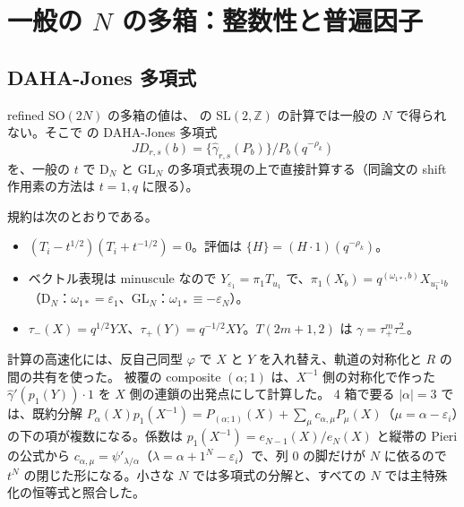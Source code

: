 \section{一般の $N$ の多箱：整数性と普遍因子}\label{sec:generalN}

\subsection{DAHA-Jones 多項式}
refined SO$(2N)$ の多箱の値は、\cite{AgSc12} の SL$(2,\mathbb{Z})$ の計算では一般の $N$ で得られない。そこで \cite{Cherednik11} の DAHA-Jones 多項式
\[
JD_{r,s}(b) = \{\hat\gamma_{r,s}(P_b)\}/P_b(q^{-\rho_k})
\]
を、一般の $t$ で D$_N$ と GL$_N$ の多項式表現の上で直接計算する（同論文の shift 作用素の方法は $t = 1, q$ に限る）。

規約は次のとおりである。
\begin{itemize}
\item $(T_i - t^{1/2})(T_i + t^{-1/2}) = 0$。評価は $\{H\} = (H\cdot 1)(q^{-\rho_k})$。
\item ベクトル表現は minuscule なので $Y_{\varepsilon_1} = \pi_1 T_{u_1}$ で、$\pi_1(X_b) = q^{(\omega_{1*}, b)}X_{u_1^{-1}b}$（D$_N$：$\omega_{1*} = \varepsilon_1$、GL$_N$：$\omega_{1*} \equiv -\varepsilon_N$）。
\item $\tau_-(X) = q^{1/2}YX$、$\tau_+(Y) = q^{-1/2}XY$。$T(2m+1, 2)$ は $\gamma = \tau_+^m\tau_-^2$。
\end{itemize}
計算の高速化には、反自己同型 $\varphi$ で $X$ と $Y$ を入れ替え、軌道の対称化と $R$ の間の共有を使った。
被覆の composite $(\alpha;1)$ は、$X^{-1}$ 側の対称化で作った $\hat\gamma'(p_1(Y))\cdot 1$ を $X$ 側の連鎖の出発点にして計算した。
4 箱で要る $|\alpha| = 3$ では、既約分解 $P_\alpha(X)p_1(X^{-1}) = P_{(\alpha;1)}(X) + \sum_\mu c_{\alpha,\mu}P_\mu(X)$（$\mu = \alpha - \varepsilon_i$）の下の項が複数になる。係数は $p_1(X^{-1}) = e_{N-1}(X)/e_N(X)$ と縦帯の Pieri の公式から $c_{\alpha,\mu} = \psi'_{\lambda/\alpha}$（$\lambda = \alpha + 1^N - \varepsilon_i$）で、列 0 の脚だけが $N$ に依るので $t^N$ の閉じた形になる。小さな $N$ では多項式の分解と、すべての $N$ では主特殊化の恒等式と照合した。

